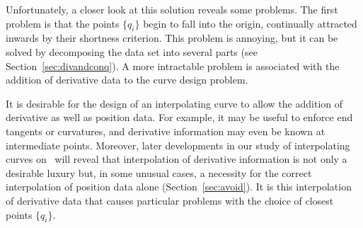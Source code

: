 Unfortunately, a closer look at this solution reveals some problems.
The first problem is that the points $\{q_i\}$ begin to fall
into the origin, continually attracted inwards by their shortness criterion.
This problem is annoying, but it can be solved by decomposing
the data set into several parts (see Section~\ref{sec:divandconq}).
A more intractable problem is associated with the addition of derivative
data to the curve design problem.

It is desirable for the design of an interpolating curve to allow the 
addition of derivative as well as position data.
For example, it may be useful to enforce end tangents or curvatures,
and derivative information may even be known at intermediate points.
Moreover, later developments in our study of interpolating curves on \ will
reveal that interpolation of derivative information is not only a desirable 
luxury but, in some unusual cases, a necessity for the correct 
interpolation of position data alone (Section~\ref{sec:avoid}).
It is this interpolation of derivative data that causes particular problems
with the choice of closest points $\{q_i\}$.

